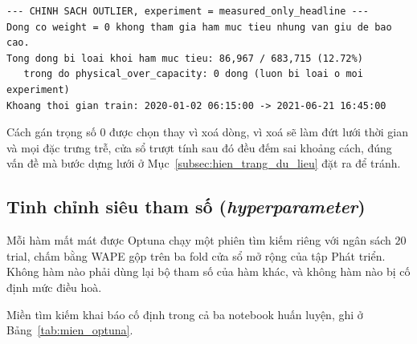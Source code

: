 \documentclass[12pt, a4paper]{report}
\begin{document}
\begingroup
\par{}\vspace{8pt}
\footnotesize\renewcommand{\baselinestretch}{1.0}\selectfont
\begin{verbatim}
--- CHINH SACH OUTLIER, experiment = measured_only_headline ---
Dong co weight = 0 khong tham gia ham muc tieu nhung van giu de bao cao.
Tong dong bi loai khoi ham muc tieu: 86,967 / 683,715 (12.72%)
   trong do physical_over_capacity: 0 dong (luon bi loai o moi experiment)
Khoang thoi gian train: 2020-01-02 06:15:00 -> 2021-06-21 16:45:00
\end{verbatim}
\par\vspace{8pt}
\endgroup
Cách gán trọng số $0$ được chọn thay vì xoá dòng, vì xoá sẽ làm đứt lưới thời gian và mọi đặc
trưng trễ, cửa sổ trượt tính sau đó đều đếm sai khoảng cách, đúng vấn đề mà bước dựng lưới ở
Mục~\ref{subsec:hien_trang_du_lieu} đặt ra để tránh.

\FloatBarrier
\subsection{Tinh chỉnh siêu tham số (\textit{hyperparameter})}

Mỗi hàm mất mát được Optuna chạy một phiên tìm kiếm riêng với ngân sách $20$ trial,
chấm bằng WAPE gộp trên ba fold cửa sổ mở rộng của tập Phát triển. Không hàm nào phải dùng lại
bộ tham số của hàm khác, và không hàm nào bị cố định mức điều hoà.

Miền tìm kiếm khai báo cố định trong cả ba notebook huấn luyện, ghi ở
Bảng~\ref{tab:mien_optuna}.
\end{document}
